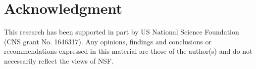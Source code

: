 \section{Acknowledgment}
This research has been supported in part by US National Science Foundation (CNS grant No. 1646317). Any opinions, findings and conclusions or recommendations expressed in this material are those of the author(s) and do not necessarily reflect the views of NSF.



